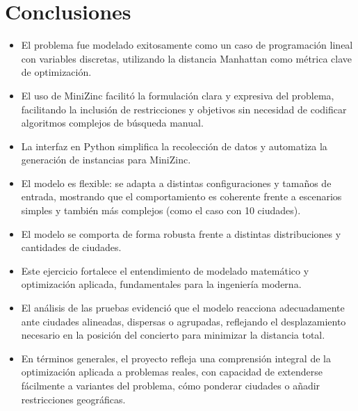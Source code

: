 \documentclass[conference]{IEEEtran}
\begin{document}
\section{Conclusiones}
\begin{itemize}
	\item
	El problema fue modelado exitosamente como un caso de programación
	lineal con variables discretas, utilizando la distancia Manhattan como
	métrica clave de optimización.
	\item
	El uso de MiniZinc facilitó la formulación clara y expresiva del
	problema, facilitando la inclusión de restricciones y objetivos sin
	necesidad de codificar algoritmos complejos de búsqueda manual.
	\item
	La interfaz en Python simplifica la recolección de datos y automatiza
	la generación de instancias para MiniZinc.
	\item
	El modelo es flexible: se adapta a distintas configuraciones y tamaños
	de entrada, mostrando que el comportamiento es coherente frente a
	escenarios simples y también más complejos (como el caso con 10
	ciudades).
	\item
	El modelo se comporta de forma robusta frente a distintas
	distribuciones y cantidades de ciudades.
	\item
	Este ejercicio fortalece el entendimiento de modelado matemático y
	optimización aplicada, fundamentales para la ingeniería moderna.
	\item
	El análisis de las pruebas evidenció que el modelo reacciona
	adecuadamente ante ciudades alineadas, dispersas o agrupadas,
	reflejando el desplazamiento necesario en la posición del concierto
	para minimizar la distancia total.
	\item
	En términos generales, el proyecto refleja una comprensión integral de
	la optimización aplicada a problemas reales, con capacidad de
	extenderse fácilmente a variantes del problema, cómo ponderar ciudades
	o añadir restricciones geográficas.
\end{itemize}
\end{document}
